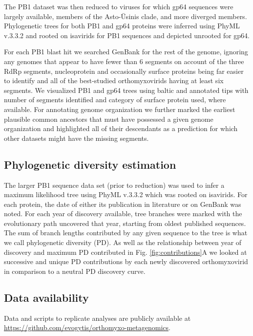 \documentclass[11pt]{article}
\begin{document}
The PB1 dataset was then reduced to viruses for which gp64 sequences were largely available, members of the Asto-\={U}sinis clade, and more diverged members.
Phylogenetic trees for both PB1 and gp64 proteins were inferred using PhyML v.3.3.2 and rooted on isavirids for PB1 sequences and depicted unrooted for gp64.

For each PB1 blast hit we searched GenBank for the rest of the genome, ignoring any genomes that appear to have fewer than 6 segments on account of the three RdRp segments, nucleoprotein and occasionally surface proteins being far easier to identify and all of the best-studied orthomyxovirids having at least six segments.
We visualized PB1 and gp64 trees using baltic and annotated tips with number of segments identified and category of surface protein used, where available.
For annotating genome organization we further marked the earliest plausible common ancestors that must have possessed a given genome organization and highlighted all of their descendants as a prediction for which other datasets might have the missing segments.


\subsection{Phylogenetic diversity estimation}

The larger PB1 sequence data set (prior to reduction) was used to infer a maximum likelihood tree using PhyML v.3.3.2 which was rooted on isavirids.
For each protein, the date of either its publication in literature or on GenBank was noted.
For each year of discovery available, tree branches were marked with the evolutionary path uncovered that year, starting from oldest published sequences.
The sum of branch lengths contributed by any given sequence to the tree is what we call phylogenetic diversity (PD).
As well as the relationship between year of discovery and maximum PD contributed in Fig. \ref{fig:contributions}A we looked at successive and unique PD contributions by each newly discovered orthomyxovirid in comparison to a neutral PD discovery curve.

\subsection{Data availability}

Data and scripts to replicate analyses are publicly available at \url{https://github.com/evogytis/orthomyxo-metagenomics}.
\end{document}
